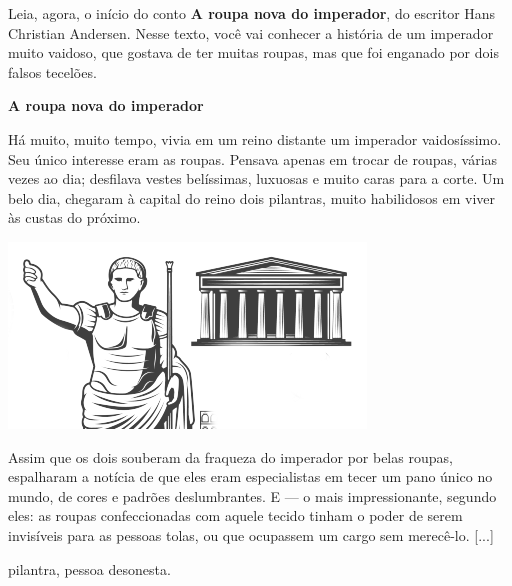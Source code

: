 Leia, agora, o início do conto \textbf{A roupa nova do imperador}, do 
escritor Hans Christian Andersen. Nesse texto, você vai conhecer a 
história de um imperador muito vaidoso, que gostava de ter muitas
roupas, mas que foi enganado por dois falsos tecelões.


\begin{myquote}
\textbf{A roupa nova do imperador}

Há muito, muito tempo, vivia em um reino distante um imperador
vaidosíssimo. Seu único interesse eram as roupas. Pensava apenas em
trocar de roupas, várias vezes ao dia; desfilava vestes belíssimas,
luxuosas e muito caras para a corte. Um belo dia, chegaram à capital do
reino dois pilantras, muito habilidosos em viver às custas do próximo.

\begin{center}
\includegraphics[width=\textwidth]{media/image2.png}
\end{center}

Assim que os dois souberam da fraqueza do imperador por belas roupas,
espalharam a notícia de que eles eram especialistas em tecer um pano
único no mundo, de cores e padrões deslumbrantes. E --- o mais
impressionante, segundo eles: as roupas confeccionadas com aquele tecido
tinham o poder de serem invisíveis para as pessoas tolas, ou que
ocupassem um cargo sem merecê-lo. {[}...{]}\\

\begin{small}
 pilantra, pessoa desonesta.\\
\end{small}

\end{myquote}

